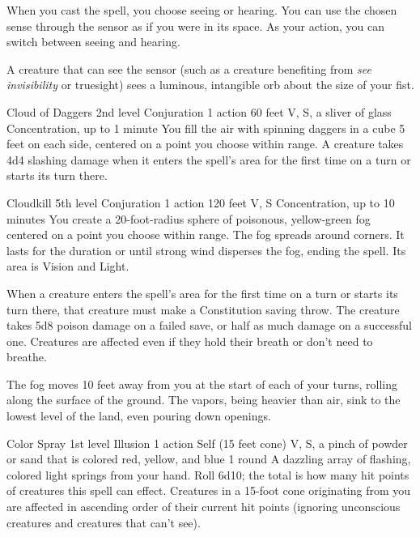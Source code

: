\documentclass[10pt,a4paper,twoside,bg=print,twocolumn,openany,nodeprecatedcode]{dndbook}
\begin{document}
When you cast the spell, you choose seeing or hearing. You can use the chosen sense through the sensor as if you were in its space. As your action, you can switch between seeing and hearing.

A creature that can see the sensor (such as a creature benefiting from \textit{see invisibility} or truesight) sees a luminous, intangible orb about the size of your fist.



\DndSpellHeader%
{Cloud of Daggers}
{2nd level Conjuration}
{1 action}
{60 feet}
{V, S, a sliver of glass}
{Concentration, up to 1 minute}
You fill the air with spinning daggers in a cube 5 feet on each side, centered on a point you choose within range. A creature takes 4d4 slashing damage when it enters the spell's area for the first time on a turn or starts its turn there.



\DndSpellHeader%
{Cloudkill}
{5th level Conjuration}
{1 action}
{120 feet}
{V, S}
{Concentration, up to 10 minutes}
You create a 20-foot-radius sphere of poisonous, yellow-green fog centered on a point you choose within range. The fog spreads around corners. It lasts for the duration or until strong wind disperses the fog, ending the spell. Its area is Vision and Light.

When a creature enters the spell's area for the first time on a turn or starts its turn there, that creature must make a Constitution saving throw. The creature takes 5d8 poison damage on a failed save, or half as much damage on a successful one. Creatures are affected even if they hold their breath or don't need to breathe.

The fog moves 10 feet away from you at the start of each of your turns, rolling along the surface of the ground. The vapors, being heavier than air, sink to the lowest level of the land, even pouring down openings.



\DndSpellHeader%
{Color Spray}
{1st level Illusion}
{1 action}
{Self (15 feet cone)}
{V, S, a pinch of powder or sand that is colored red, yellow, and blue}
{1 round}
A dazzling array of flashing, colored light springs from your hand. Roll 6d10; the total is how many hit points of creatures this spell can effect. Creatures in a 15-foot cone originating from you are affected in ascending order of their current hit points (ignoring unconscious creatures and creatures that can't see).
\end{document}
